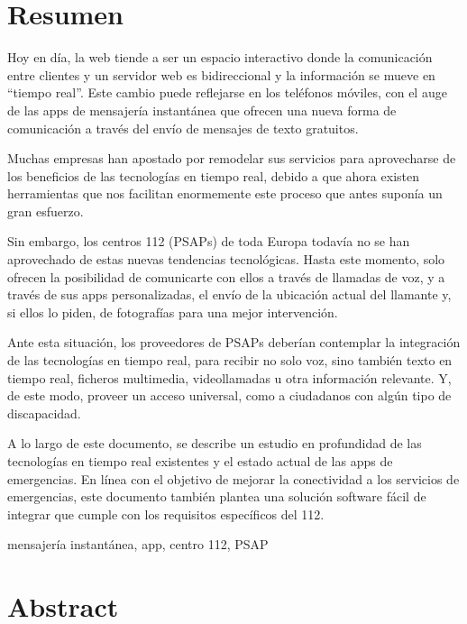 \chapter*{Resumen}

\begin{abstractEs}
	Hoy en día, la web tiende a ser un espacio interactivo donde la comunicación entre clientes y un servidor web es bidireccional y la información se mueve en “tiempo real”. Este cambio puede reflejarse en los teléfonos móviles, con el auge de las apps de mensajería instantánea que ofrecen una nueva forma de comunicación a través del envío de mensajes de texto gratuitos.

	Muchas empresas han apostado por remodelar sus servicios para aprovecharse de los beneficios de las tecnologías en tiempo real, debido a que ahora existen herramientas que nos facilitan enormemente este proceso que antes suponía un gran esfuerzo.

	Sin embargo, los centros 112 (PSAPs) de toda Europa todavía no se han aprovechado de estas nuevas tendencias tecnológicas. Hasta este momento, solo ofrecen la posibilidad de comunicarte con ellos a través de llamadas de voz, y a través de sus apps personalizadas, el envío de la ubicación actual del llamante y, si ellos lo piden, de fotografías para una mejor intervención.

	Ante esta situación, los proveedores de PSAPs deberían contemplar la integración de las tecnologías en tiempo real, para recibir no solo voz, sino también texto en tiempo real, ficheros multimedia, videollamadas u otra información relevante. Y, de este modo, proveer un acceso universal, como a ciudadanos con algún tipo de discapacidad.

	A lo largo de este documento, se describe un estudio en profundidad de las tecnologías en tiempo real existentes y el estado actual de las apps de emergencias. En línea con el objetivo de mejorar la conectividad a los servicios de emergencias, este documento también  plantea una solución software fácil de integrar que cumple con los requisitos específicos del 112.
\end{abstractEs}

\begin{keywordsEs}
	mensajería instantánea, app, centro 112, PSAP
\end{keywordsEs}

\chapter*{Abstract}

